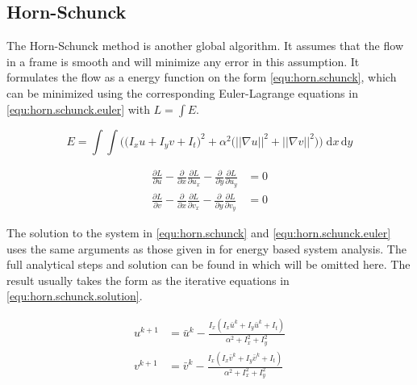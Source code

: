 \subsection{Horn-Schunck}\label{sec:horn-schunck}
The Horn-Schunck method is another global algorithm\citet{horn80}. It assumes that the flow in a frame is smooth and will minimize any error in this assumption.
It formulates the flow as a energy function on the form \eqref{equ:horn.schunck}, which can be minimized using the corresponding Euler-Lagrange equations in \eqref{equ:horn.schunck.euler} with
$L=\int{E}$.

\begin{equation}\label{equ:horn.schunck}
	E = \int \int \Big ( \big (I_x u + I_y v + I_t\big )^2 + \alpha^2\big (||\nabla u||^2 + ||\nabla v||^2\big ) \Big )\; \mathrm{d}x\,\mathrm{d}y
\end{equation}

\begin{equation}\label{equ:horn.schunck.euler}
	\begin{split}
		\frac{\partial L}{\partial u} - \frac{\partial}{\partial x}\frac{\partial L}{\partial u_x} - \frac{\partial}{\partial y}\frac{\partial L}{\partial u_y} &= 0 \\
		\frac{\partial L}{\partial v} - \frac{\partial}{\partial x}\frac{\partial L}{\partial v_x} - \frac{\partial}{\partial y}\frac{\partial L}{\partial v_y} &= 0
	\end{split}
\end{equation}

The solution to the system in \eqref{equ:horn.schunck} and \eqref{equ:horn.schunck.euler} uses the same arguments as those given in \citet{khalil01} for energy based system analysis.
The full analytical steps and solution can be found in \citet{horn80} which will be omitted here. The result usually takes the form as the iterative equations in \eqref{equ:horn.schunck.solution}.

\begin{equation}\label{equ:horn.schunck.solution}
	\begin{split}
		u^{k + 1} &= \bar{u}^k - \frac{I_x\left(I_x\bar{u}^k + I_y\bar{u}^k + I_t\right)}{\alpha^2 + I_x^2 + I_y^2} \\
		v^{k + 1} &= \bar{v}^k - \frac{I_x\left(I_x\bar{v}^k + I_y\bar{v}^k + I_t\right)}{\alpha^2 + I_x^2 + I_y^2}
	\end{split}
\end{equation}

